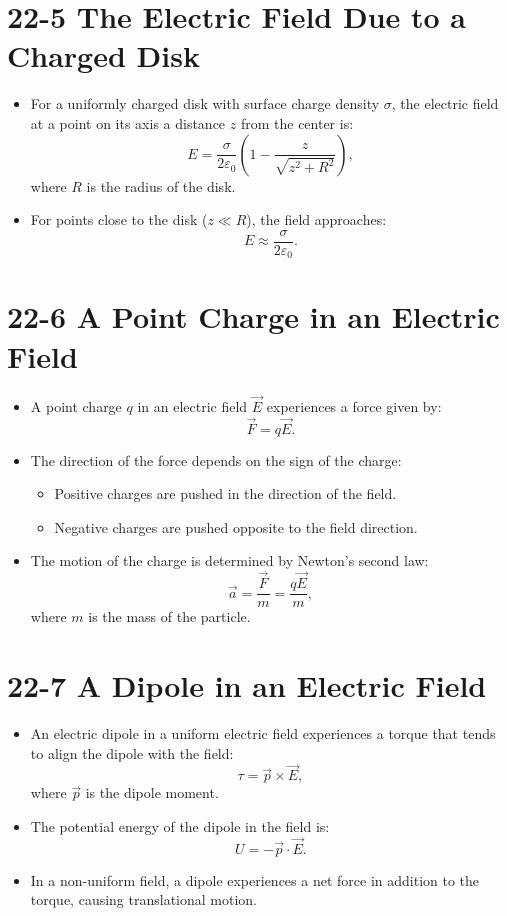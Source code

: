 \documentclass{article}
\begin{document}
\section*{22-5 The Electric Field Due to a Charged Disk}
\begin{itemize}
    \item For a uniformly charged disk with surface charge density $\sigma$, the electric field at a point on its axis a distance $z$ from the center is:
    \[
    E = \frac{\sigma}{2\varepsilon_0} \left( 1 - \frac{z}{\sqrt{z^2 + R^2}} \right),
    \]
    where $R$ is the radius of the disk.
    \item For points close to the disk ($z \ll R$), the field approaches:
    \[
    E \approx \frac{\sigma}{2\varepsilon_0}.
    \]
\end{itemize}

\section*{22-6 A Point Charge in an Electric Field}
\begin{itemize}
    \item A point charge $q$ in an electric field $\vec{E}$ experiences a force given by:
    \[
    \vec{F} = q \vec{E}.
    \]
    \item The direction of the force depends on the sign of the charge:
    \begin{itemize}
        \item Positive charges are pushed in the direction of the field.
        \item Negative charges are pushed opposite to the field direction.
    \end{itemize}
    \item The motion of the charge is determined by Newton’s second law:
    \[
    \vec{a} = \frac{\vec{F}}{m} = \frac{q \vec{E}}{m},
    \]
    where $m$ is the mass of the particle.
\end{itemize}

\section*{22-7 A Dipole in an Electric Field}
\begin{itemize}
    \item An electric dipole in a uniform electric field experiences a torque that tends to align the dipole with the field:
    \[
    \tau = \vec{p} \times \vec{E},
    \]
    where $\vec{p}$ is the dipole moment.
    \item The potential energy of the dipole in the field is:
    \[
    U = -\vec{p} \cdot \vec{E}.
    \]
    \item In a non-uniform field, a dipole experiences a net force in addition to the torque, causing translational motion.
\end{itemize}
\end{document}
